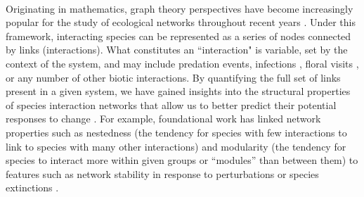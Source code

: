 \paragraph*{}
Originating in mathematics, graph theory perspectives have become increasingly popular for the study of ecological networks throughout recent years \parencite{bascompte2007plant, landi2018complexity, valdovinos2019mutualistic, guimaraes2020structure}. Under this framework, interacting species can be represented as a series of nodes connected by links (interactions). What constitutes an ``interaction" is variable, set by the context of the system, and may include predation events, infections \parencite{dallas2017predicting}, floral visits \parencite{Young21}, or any number of other biotic interactions. By quantifying the full set of links present in a given system, we have gained insights into the structural properties of species interaction networks that allow us to better predict their potential responses to change \parencite{gilarranz2017effects}. For example, foundational work has linked network properties such as nestedness (the tendency for species with few interactions to link to species with many other interactions) and modularity (the tendency for species to interact more within given groups or ``modules'' than between them) to features such as network stability in response to perturbations or species extinctions \parencite{okuyama2008network, thebault2010stability, suweis2013emergence}.




